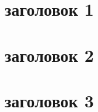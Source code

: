 \label{app:A}
\section*{заголовок 1}
\lipsum[1]

\section*{заголовок 2}
\lipsum[1]

\section*{заголовок 3}
\lipsum[1]